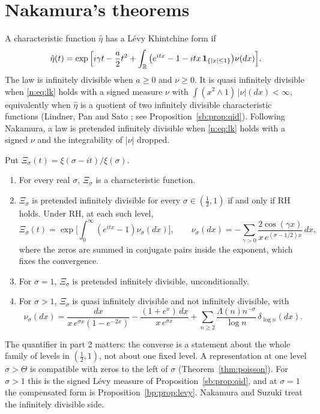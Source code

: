 \section{Nakamura's theorems}\label{n:sec:nak}

A characteristic function $\hat\eta$ has a Lévy Khintchine form if
\begin{equation}\label{n:eq:lk}
\hat\eta(t)=\exp\Big[i\gamma t-\frac a2t^2+\int_{\mathbb{R}}\big(e^{itx}-1-itx\,\mathbf 1_{\{|x|\le1\}}\big)\nu(dx)\Big].
\end{equation}
The law is infinitely divisible when $a\ge0$ and $\nu\ge0$. It is quasi infinitely divisible when \eqref{n:eq:lk} holds with a signed measure $\nu$ with $\int(x^2\wedge1)\,|\nu|(dx)<\infty$, equivalently when $\hat\eta$ is a quotient of two infinitely divisible characteristic functions (Lindner, Pan and Sato \cite{LPS18}; see Proposition~\ref{sb:prop:qid}). Following Nakamura, a law is pretended infinitely divisible when \eqref{n:eq:lk} holds with a signed $\nu$ and the integrability of $|\nu|$ dropped.

\begin{theorem}\label{n:thm:nak}
Put $\Xi_\sigma(t)=\xi(\sigma-it)/\xi(\sigma)$.
\begin{enumerate}
\item For every real $\sigma$, $\Xi_\sigma$ is a characteristic function.
\item $\Xi_\sigma$ is pretended infinitely divisible for every $\sigma\in(\frac12,1)$ if and only if RH holds. Under RH, at each such level,
\[
\Xi_\sigma(t)=\exp\Big[\int_0^\infty(e^{itx}-1)\nu_\sigma(dx)\Big],\qquad \nu_\sigma(dx)=-\sum_{\gamma>0}\frac{2\cos(\gamma x)}{x\,e^{(\sigma-1/2)x}}\,dx,
\]
where the zeros are summed in conjugate pairs inside the exponent, which fixes the convergence.
\item For $\sigma=1$, $\Xi_\sigma$ is pretended infinitely divisible, unconditionally.
\item For $\sigma>1$, $\Xi_\sigma$ is quasi infinitely divisible and not infinitely divisible, with
\begin{equation}\label{n:eq:naknu}
\nu_\sigma(dx)=\frac{dx}{x\,e^{\sigma x}(1-e^{-2x})}-\frac{(1+e^x)\,dx}{x\,e^{\sigma x}}+\sum_{n\ge2}\frac{\Lambda(n)n^{-\sigma}}{\log n}\,\delta_{\log n}(dx).
\end{equation}
\end{enumerate}
\end{theorem}

The quantifier in part 2 matters: the converse is a statement about the whole family of levels in $(\frac12,1)$, not about one fixed level. A representation at one level $\sigma>\Theta$ is compatible with zeros to the left of $\sigma$ (Theorem~\ref{thm:poisson}). For $\sigma>1$ this is the signed Lévy measure of Proposition~\ref{sb:prop:qid}, and at $\sigma=1$ the compensated form is Proposition~\ref{bp:prop:levy}. Nakamura and Suzuki \cite{NakamuraSuzuki23} treat the infinitely divisible side.

